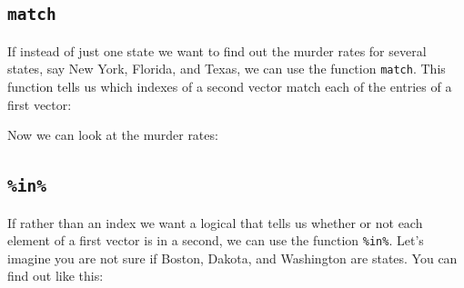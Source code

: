 \documentclass[
]{krantz}
\newenvironment{Shaded}{\begin{snugshade}}{\end{snugshade}}
\newcommand{\CommentTok}[1]{\textcolor[rgb]{0.37,0.37,0.37}{\textit{#1}}}
\newcommand{\DataTypeTok}[1]{\textcolor[rgb]{0.27,0.27,0.27}{#1}}
\newcommand{\KeywordTok}[1]{\textcolor[rgb]{0.27,0.27,0.27}{\textbf{#1}}}
\newcommand{\NormalTok}[1]{#1}
\newcommand{\OperatorTok}[1]{\textcolor[rgb]{0.43,0.43,0.43}{\textbf{#1}}}
\newcommand{\StringTok}[1]{\textcolor[rgb]{0.5,0.5,0.5}{#1}}
\begin{document}
\hypertarget{match}{%
\subsection{\texorpdfstring{\texttt{match}}{match}}\label{match}}

If instead of just one state we want to find out the murder rates for several states, say New York, Florida, and Texas, we can use the function \texttt{match}. This function tells us which indexes of a second vector match each of the entries of a first vector:

\begin{Shaded}
\end{Shaded}

Now we can look at the murder rates:

\begin{Shaded}
\end{Shaded}

\hypertarget{in}{%
\subsection{\texorpdfstring{\texttt{\%in\%}}{\%in\%}}\label{in}}

If rather than an index we want a logical that tells us whether or not each element of a first vector is in a second, we can use the function \texttt{\%in\%}. Let's imagine you are not sure if Boston, Dakota, and Washington are states. You can find out like this:

\begin{Shaded}
\end{Shaded}
\end{document}
